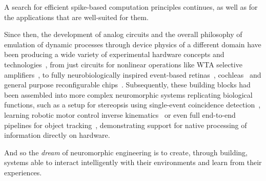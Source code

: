 A search for efficient spike-based computation principles continues, as well as for the applications that are well-suited for them. 

Since then, the development of analog circuits and the overall philosophy of emulation of dynamic processes through device physics of a different domain have been producing a wide variety of experimental hardware concepts and technologies~\cite{Christensen_etal22, Laughlin_Sejnowski03,Liu_Delbruck10,Liu_etal14,Chicca_etal14, Pfeil_etal13}, from just circuits for nonlinear operations like \ac{WTA} selective amplifiers~\cite{Starzyk_Fang93, Chicca_etal07}, to fully neurobiologically inspired event-based retinas~\cite{DVS}, cochleas~\cite{Liu_etal14a} and general purpose reconfigurable chips~\cite{Moradi_etal18, Neckar_etal19, Pehle_etal22}. Subsequently, these building blocks had been assembled into more complex neuromorphic systems replicating biological functions, such as a setup for stereopsis using single-event coincidence detection~\cite{Osswald_etal17, Risi_etal21}, learning robotic motor control inverse kinematics~\cite{Zhao_etal20} or even full end-to-end pipelines for object tracking~\cite{Serrano-Gotarredona_etal09}, demonstrating support for native processing of information directly on hardware. %



And so the \emph{dream} of neuromorphic engineering is to create, through building, systems able to interact intelligently with their environments and learn from their experiences.







